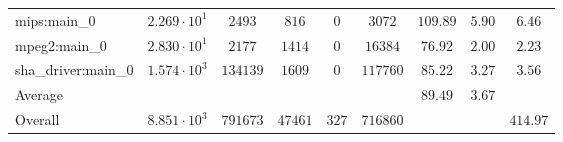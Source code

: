 \begin{tabular}{|l|c|c|c|c|c|c|c|c|}
mips:main\_0            & $ 2.269 \cdot 10^{1} $ & $ 2493   $ & $ 816   $ & $ 0   $ & $ 3072   $ & $ 109.89      $ & $ 5.90    $ & $ 6.46    $ \\
mpeg2:main\_0           & $ 2.830 \cdot 10^{1} $ & $ 2177   $ & $ 1414  $ & $ 0   $ & $ 16384  $ & $ 76.92       $ & $ 2.00    $ & $ 2.23    $ \\
sha\_driver:main\_0     & $ 1.574 \cdot 10^{3} $ & $ 134139 $ & $ 1609  $ & $ 0   $ & $ 117760 $ & $ 85.22       $ & $ 3.27    $ & $ 3.56    $ \\
\hline
Average                 & $                    $ & $        $ & $       $ & $     $ & $        $ & $ 89.49       $ & $ 3.67    $ & $         $ \\
\hline
Overall                 & $ 8.851 \cdot 10^{3} $ & $ 791673 $ & $ 47461 $ & $ 327 $ & $ 716860 $ & $             $ & $         $ & $ 414.97  $ \\
\hline
\end{tabular}
